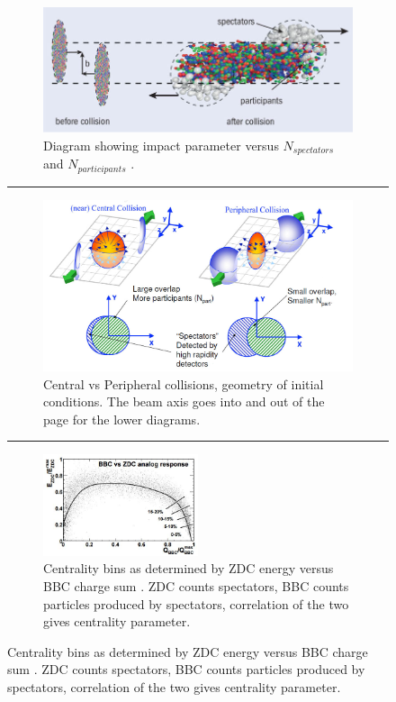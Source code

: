 \begin{figure}[htbp!]
  \centering
    \begin{subfigure}[p]{0.7\textwidth}
    \includegraphics[width=1\textwidth]{Figures/spectatorsvsparticipants.jpg}
    \caption[Diagram showing impact parameter versus $N_{spectators}$ and $N_{participants}$]{Diagram showing impact parameter versus $N_{spectators}$ and $N_{participants}$ \citep{cernhifireball}.}
    \label{fig:cernfireball}
    \end{subfigure} 
    \rule{35em}{0.5pt}
    \begin{subfigure}[p]{0.7\textwidth}
    \includegraphics[width=1\textwidth]{Figures/centralvsperipheral.jpg}
	\caption[Central vs Peripheral collisions, geometry of initial conditions]{Central vs Peripheral collisions, geometry of initial conditions. The beam axis goes into and out of the page for the lower diagrams.}
\label{fig:centvsperiph}
    \end{subfigure}
    \rule{35em}{0.5pt}
\begin{subfigure}[p]{1\textwidth}
  \centering
    \includegraphics[width=0.5\textwidth]{prevplots/bbczdcanaresponse.JPG}

  \caption[Centrality bins as determined by ZDC energy versus BBC charge sum]{Centrality bins as determined by ZDC energy versus BBC charge sum \citep{Ghosh2001}. ZDC counts spectators, BBC counts particles produced by spectators, correlation of the two gives centrality parameter.}
  \label{fig:zdcvsbbc}
\end{subfigure}
\end{figure}

